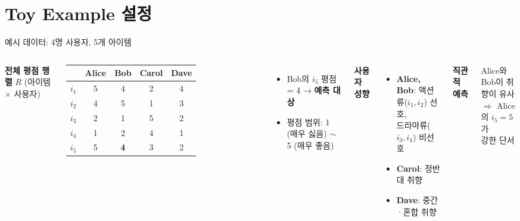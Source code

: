 \documentclass[aspectratio=169, 10pt]{beamer}
\begin{document}
\section{Toy Example 설정}

\begin{frame}{예시 데이터: 4명 사용자, 5개 아이템}

  \begin{columns}[T]
      \textbf{전체 평점 행렬} $R$ (아이템 $\times$ 사용자)
      \vspace{0.3em}

      \renewcommand{\arraystretch}{1.3}
      \begin{tabular}{c|cccc}
        \toprule
                  & Alice & Bob & Carol & Dave \\
        \midrule
        $i_1$     & 5 & 4 & 2 & 4 \\
        $i_2$     & 4 & 5 & 1 & 3 \\
        $i_3$     & 2 & 1 & 5 & 2 \\
        $i_4$     & 1 & 2 & 4 & 1 \\
        \rowcolor{hilight}
        $i_5$     & 5 & \textbf{4} & 3 & 2 \\
        \bottomrule
      \end{tabular}
      \vspace{0.4em}
      \begin{itemize}
        \item \colorbox{hilight}{Bob의 $i_5$ 평점 = 4} → \textbf{예측 대상}
        \item 평점 범위: 1 (매우 싫음) $\sim$ 5 (매우 좋음)
      \end{itemize}

      \textbf{사용자 성향}
      \begin{itemize}
        \item \textbf{Alice, Bob}: 액션류($i_1, i_2$) 선호,\\
              드라마류($i_3, i_4$) 비선호
        \item \textbf{Carol}: 정반대 취향
        \item \textbf{Dave}: 중간·혼합 취향
      \end{itemize}
      \vspace{0.8em}
      \textbf{직관적 예측}
      \begin{exampleblock}{}
        Alice와 Bob이 취향이 유사 \\
        $\Rightarrow$ Alice의 $i_5 = 5$가\\
        \quad\; 강한 단서
      \end{exampleblock}
  \end{columns}
\end{frame}
\end{document}
